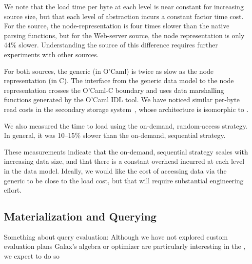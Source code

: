 We note that the load time per byte at each level is near constant for
increasing source size, but that each level of abstraction incurs a
constant factor time cost.  For the \dibbler{} source, the \padx{}
node-representation is four times slower than the native \pads{}
parsing functions, but for the Web-server source, the \padx{} node
representation is only 44\% slower.  Understanding the source of this
difference requires further experiments with other sources.

For both sources, the generic \condm{} (in O'Caml) is twice as slow as
the node representation (in C).  The interface from the generic data
model to the node representation crosses the O'Caml-C boundary and
uses data marshalling functions generated by the O'Caml IDL tool.  We
have noticed similar per-byte read costs in the \Galax{} secondary
storage system~\cite{galax:ximep2004}, whose architecture is
isomorphic to \padx{}.  

We also measured the time to load using the on-demand, random-access
strategy.  In general, it was 10--15\% slower than the on-demand,
sequential strategy. 

These measurements indicate that the on-demand, sequential strategy
scales with increasing data size, and that there is a constant
overhead incurred at each level in the data model.  Ideally, we would
like the cost of accessing data via the generic \condm{} to be close
to the \pads{} load cost, but that will require substantial
engineering effort.


\subsection{Materialization and Querying}

Something about query evaluation:
Although we have not explored custom evaluation plans 
Galax's algebra or optimizer are particularly interesting in the 
\padx{}, we expect to do so 

